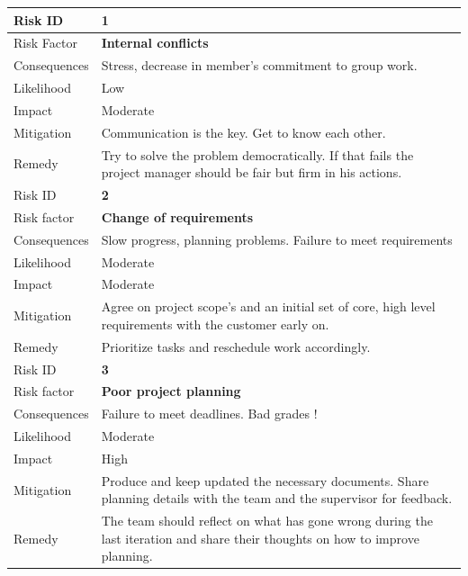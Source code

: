 \begin{table}[h]
\begin{tabular}{ | l | p{11.5cm} | }

  \hline
  Risk ID & \textbf{1} \\
  \hline\noalign{\smallskip}\noalign{\smallskip}\hline
  Risk Factor   & \textbf{Internal conflicts} \\
  Consequences  & Stress, decrease in member’s commitment to group work.\\
  Likelihood    & Low \\
  Impact        & Moderate \\
  Mitigation    & Communication is the key. Get to know each other. \\
  Remedy        & Try to solve the problem democratically. \newline
                If that fails the project manager should be fair but firm in his actions. \\
  \hline
  
  \hline\noalign{\smallskip}\noalign{\smallskip}\hline
  Risk ID & \textbf{2} \\
  \hline\noalign{\smallskip}\noalign{\smallskip}\hline
  Risk factor   & \textbf{Change of requirements} \\
  Consequences  & Slow progress, planning problems. Failure to meet requirements \\
  Likelihood    & Moderate \\
  Impact        & Moderate \\
  Mitigation    & Agree on project scope’s and an initial set of core, high level requirements with the customer early on. \\
  Remedy        & Prioritize tasks and reschedule work accordingly. \\
  \hline

  \hline\noalign{\smallskip}\noalign{\smallskip}\hline
  Risk ID & \textbf{3} \\
  \hline\noalign{\smallskip}\noalign{\smallskip}\hline
  Risk factor   & \textbf{Poor project planning} \\
  Consequences  & Failure to meet deadlines. Bad grades !\\
  Likelihood    & Moderate \\
  Impact        & High \\
  Mitigation    & Produce and keep updated the necessary documents.
                Share planning details with the team and the supervisor for feedback. \\
  Remedy        & The team should reflect on what has gone wrong during the last iteration and
                share their thoughts on how to improve planning. \\
  \hline


\end{tabular}
\end{table}
